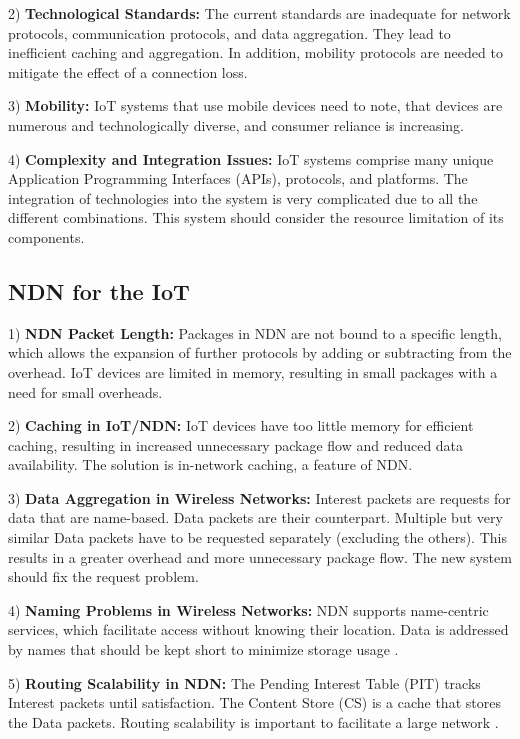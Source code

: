 \documentclass[conference]{IEEEtran}
\begin{document}
2) \textbf{Technological Standards:}
The current standards are inadequate for network protocols, communication protocols, and data aggregation. They lead to inefficient caching and aggregation. 
In addition, mobility protocols are needed to mitigate the effect of a connection loss. 

3) \textbf{Mobility:}
IoT systems that use mobile devices need to note, that devices are numerous and technologically diverse, and consumer reliance is increasing. 

4) \textbf{Complexity and Integration Issues:}
IoT systems comprise many unique Application Programming Interfaces (APIs), protocols, and platforms. 
The integration of technologies into the system is very complicated due to all the different combinations. This system should consider the resource limitation of its components.

\subsection{NDN for the IoT}
1) \textbf{NDN Packet Length:}
Packages in NDN are not bound to a specific length, which allows the expansion of further protocols by adding or subtracting from the overhead.
IoT devices are limited in memory, resulting in small packages with a need for small overheads.

2) \textbf{Caching in IoT/NDN:}
IoT devices have too little memory for efficient caching, resulting in increased unnecessary package flow and reduced data availability.
The solution is in-network caching, a feature of NDN.

3) \textbf{Data Aggregation in Wireless Networks:}
Interest packets are requests for data that are name-based. Data packets are their counterpart.
Multiple but very similar Data packets have to be requested separately (excluding the others). This results in a greater overhead and more unnecessary package flow. The new system should fix the request problem.

4) \textbf{Naming Problems in Wireless Networks:}
NDN supports name-centric services, which facilitate access without knowing their location. 
Data is addressed by names that should be kept short to minimize storage usage \cite{b18}. 

5) \textbf{Routing Scalability in NDN:}
The Pending Interest Table (PIT) tracks Interest packets until satisfaction. The Content Store (CS) is a cache that stores the Data packets. Routing scalability is important
to facilitate a large network \cite{b19}.
\end{document}
